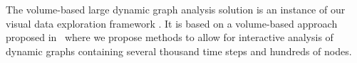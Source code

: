 
The volume-based large dynamic graph analysis solution is an instance of our visual data exploration framework {\color{Fuchsia}\framework{}}.
It is based on a volume-based approach proposed in~\cite{Bruder2019} where we propose methods to allow for interactive analysis of dynamic graphs containing several thousand time steps and hundreds of nodes.
	

